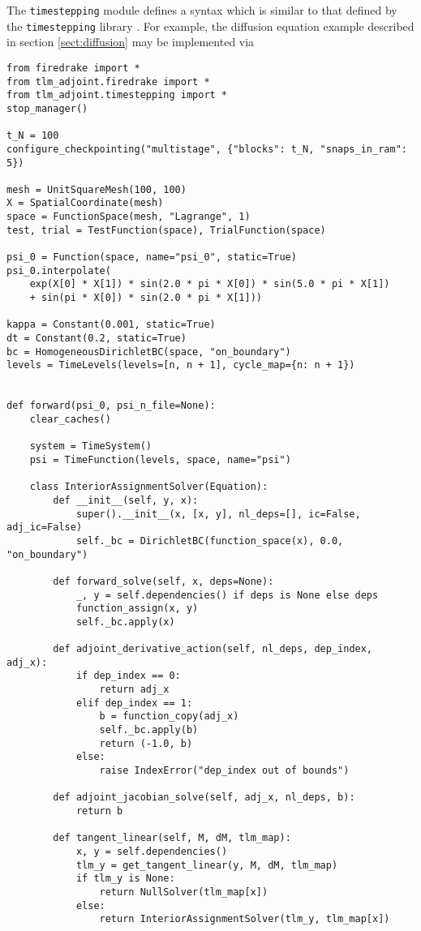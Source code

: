 \documentclass[11pt]{article}
\begin{document}
The \texttt{timestepping} module defines a syntax which is similar to that
defined by the \texttt{timestepping} library \citep[see][]{maddison2014}. For
example, the diffusion equation example described in section
\ref{sect:diffusion} may be implemented via
\begin{lstlisting}
from firedrake import *
from tlm_adjoint.firedrake import *
from tlm_adjoint.timestepping import *
stop_manager()

t_N = 100
configure_checkpointing("multistage", {"blocks": t_N, "snaps_in_ram": 5})

mesh = UnitSquareMesh(100, 100)
X = SpatialCoordinate(mesh)
space = FunctionSpace(mesh, "Lagrange", 1)
test, trial = TestFunction(space), TrialFunction(space)

psi_0 = Function(space, name="psi_0", static=True)
psi_0.interpolate(
    exp(X[0] * X[1]) * sin(2.0 * pi * X[0]) * sin(5.0 * pi * X[1])
    + sin(pi * X[0]) * sin(2.0 * pi * X[1]))

kappa = Constant(0.001, static=True)
dt = Constant(0.2, static=True)
bc = HomogeneousDirichletBC(space, "on_boundary")
levels = TimeLevels(levels=[n, n + 1], cycle_map={n: n + 1})


def forward(psi_0, psi_n_file=None):
    clear_caches()

    system = TimeSystem()
    psi = TimeFunction(levels, space, name="psi")

    class InteriorAssignmentSolver(Equation):
        def __init__(self, y, x):
            super().__init__(x, [x, y], nl_deps=[], ic=False, adj_ic=False)
            self._bc = DirichletBC(function_space(x), 0.0, "on_boundary")

        def forward_solve(self, x, deps=None):
            _, y = self.dependencies() if deps is None else deps
            function_assign(x, y)
            self._bc.apply(x)

        def adjoint_derivative_action(self, nl_deps, dep_index, adj_x):
            if dep_index == 0:
                return adj_x
            elif dep_index == 1:
                b = function_copy(adj_x)
                self._bc.apply(b)
                return (-1.0, b)
            else:
                raise IndexError("dep_index out of bounds")

        def adjoint_jacobian_solve(self, adj_x, nl_deps, b):
            return b

        def tangent_linear(self, M, dM, tlm_map):
            x, y = self.dependencies()
            tlm_y = get_tangent_linear(y, M, dM, tlm_map)
            if tlm_y is None:
                return NullSolver(tlm_map[x])
            else:
                return InteriorAssignmentSolver(tlm_y, tlm_map[x])


\end{lstlisting}
\end{document}
